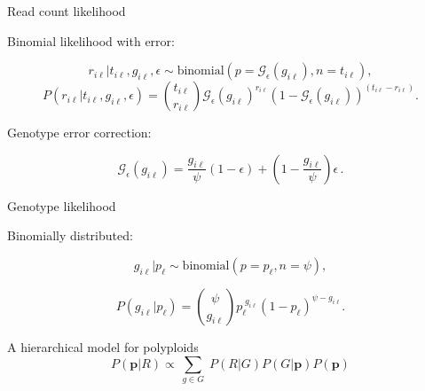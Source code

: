 \documentclass[presentation,sansserif]{beamer}
\begin{document}
\begin{frame}[c]{Read count likelihood}

	Binomial likelihood with error:

	\begin{equation*}
		r_{i\ell}|t_{i\ell},g_{i\ell},\epsilon \sim \text{binomial}(p = \mathcal{G}_\epsilon(g_{i\ell}), n = t_{i\ell}),
	\end{equation*}
	\pause
	\begin{equation}
		P(r_{i\ell}|t_{i\ell},g_{i\ell},\epsilon) = \binom{t_{i\ell}}{r_{i\ell}} \mathcal{G}_\epsilon(g_{i\ell})^{r_{i\ell}}(1 - \mathcal{G}_\epsilon(g_{i\ell}))^{(t_{i\ell}-r_{i\ell})}.
	\end{equation}
	\pause

	\vspace{0.25in}

	Genotype error correction:

	\begin{equation}
		\mathcal{G}_\epsilon(g_{i\ell}) = \frac{g_{i\ell}}{\psi}(1 - \epsilon) + \left(1 - \frac{g_{i\ell}}{\psi}\right)\epsilon\,.
	\end{equation}

\end{frame}

\begin{frame}[c]{Genotype likelihood}

	Binomially distributed:

	\begin{equation*}
		g_{i\ell}|p_\ell \sim \text{binomial}(p = p_\ell, n = \psi),
	\end{equation*}
	\pause

	\begin{equation}
		P(g_{i\ell}|p_\ell) = \binom{\psi}{g_{i\ell}} p_\ell ^ {\;g_{i\ell}} (1 - p_\ell)^{\psi - g_{i\ell}}.
	\end{equation}



\end{frame}

\begin{frame}[c]{A hierarchical model for polyploids}
	\fontsize{10pt}{10}\selectfont
	\vspace{-0.21in}
	\begin{equation}
		P(\mathbf{p} \vert R) \propto\, \sum_{g \in G} \; P(R \vert G) P(G \vert \mathbf{p}) P(\mathbf{p})
	\end{equation}

	\begin{center}
	\end{center}
\end{frame}
\end{document}
